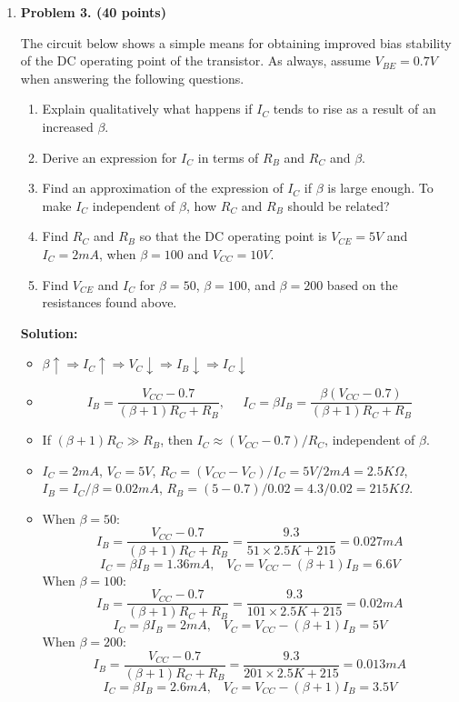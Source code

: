\begin{enumerate}
%
%
%

\item {\bf Problem 3. (40 points)} 

The circuit below shows a simple means for obtaining improved bias
stability of the DC operating point of the transistor. As always,
assume $V_{BE}=0.7V$ when answering the following questions.


\begin{enumerate}
\item Explain qualitatively what happens if $I_C$ tends to rise as a
result of an increased $\beta$.
\item Derive an expression for $I_C$ in terms of $R_B$ and $R_C$ and
$\beta$.
\item Find an approximation of the expression of $I_C$ if $\beta$ is 
large enough. To make $I_C$ independent of $\beta$, how $R_C$ and
$R_B$ should be related?
\item Find $R_C$ and $R_B$ so that the DC operating point is $V_{CE}=5V$ 
and $I_C=2mA$, when $\beta=100$ and $V_{CC}=10V$.
\item Find $V_{CE}$ and $I_C$ for $\beta=50$, $\beta=100$, and $\beta=200$
	based on the resistances found above.
\end{enumerate}

{\bf Solution:} 

\begin{itemize}
\item $\beta \uparrow \Longrightarrow I_C \uparrow \Longrightarrow V_C \downarrow 
  \Longrightarrow I_B \downarrow \Longrightarrow I_C \downarrow $
\item
\[ I_B=\frac{V_{CC}-0.7}{(\beta+1)R_C+R_B},\;\;\;\;\;
   I_C=\beta I_B=\frac{\beta(V_{CC}-0.7)}{(\beta+1)R_C+R_B}  \]
\item If $(\beta+1)R_C \gg R_B$, then $I_C \approx (V_{CC}-0.7)/R_C$, 
independent of $\beta$.
\item $I_C=2mA$, $V_C=5V$, $R_C=(V_{CC}-V_C)/I_C=5V/2mA=2.5K\Omega$,
$I_B=I_C/\beta=0.02mA$, $R_B=(5-0.7)/0.02=4.3/0.02=215K\Omega$.
\item 
When $\beta=50$:
\[	I_B=\frac{V_{CC}-0.7}{(\beta+1)R_C+R_B}=\frac{9.3}{51\times 2.5K+215}
	=0.027mA \]
\[ 	I_C=\beta I_B=1.36mA,\;\;\;V_C=V_{CC}-(\beta+1)I_B=6.6V \]
When $\beta=100$:
\[	I_B=\frac{V_{CC}-0.7}{(\beta+1)R_C+R_B}=\frac{9.3}{101\times 2.5K+215}
	=0.02mA \]
\[ 	I_C=\beta I_B=2 mA,\;\;\;V_C=V_{CC}-(\beta+1)I_B=5V \]
When $\beta=200$:
\[	I_B=\frac{V_{CC}-0.7}{(\beta+1)R_C+R_B}=\frac{9.3}{201\times 2.5K+215}
	=0.013mA \]
\[ 	I_C=\beta I_B=2.6mA,\;\;\;V_C=V_{CC}-(\beta+1)I_B=3.5V \]
\end{itemize}

\end{enumerate}



